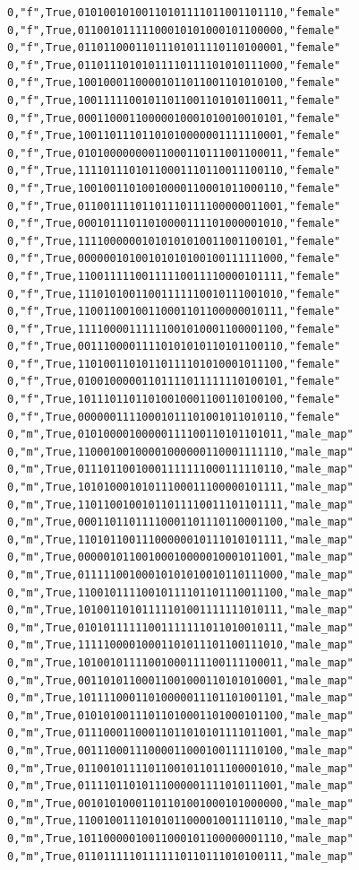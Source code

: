 \documentclass[authoryearcitations]{UoYCSproject}
\begin{document}
\begin{framed}
\begin{verbatim}
0,"f",True,01010010100110101111011001101110,"female"
0,"f",True,01100101111100010101000101100000,"female"
0,"f",True,01101100011011101011110110100001,"female"
0,"f",True,01101110101011110111101010111000,"female"
0,"f",True,10010001100001011011001101010100,"female"
0,"f",True,10011111001011011001101010110011,"female"
0,"f",True,00011000110000010001010010010101,"female"
0,"f",True,10011011101101010000001111110001,"female"
0,"f",True,01010000000011000110111001100011,"female"
0,"f",True,11110111010110001110110011100110,"female"
0,"f",True,10010011010010000110001011000110,"female"
0,"f",True,01100111101101110111100000011001,"female"
0,"f",True,00010111011010000111101000001010,"female"
0,"f",True,11110000001010101010011001100101,"female"
0,"f",True,00000010100101010100100111111000,"female"
0,"f",True,11001111100111110011110000101111,"female"
0,"f",True,11101010011001111110010111001010,"female"
0,"f",True,11001100100110001101100000010111,"female"
0,"f",True,11110000111111001010001100001100,"female"
0,"f",True,00111000011110101010110101100110,"female"
0,"f",True,11010011010110111101010001011100,"female"
0,"f",True,01001000001101111011111110100101,"female"
0,"f",True,10111011011010010001100110100100,"female"
0,"f",True,00000011110001011101001011010110,"female"
0,"m",True,01010000100000111100110101101011,"male_map"
0,"m",True,11000100100001000000110001111110,"male_map"
0,"m",True,01110110010001111111000111110110,"male_map"
0,"m",True,10101000101011100011100000101111,"male_map"
0,"m",True,11011001001011011110011101101111,"male_map"
0,"m",True,00011011011110001101110110001100,"male_map"
0,"m",True,11010110011100000010111010101111,"male_map"
0,"m",True,00000101100100010000010001011001,"male_map"
0,"m",True,01111100100010101010010110111000,"male_map"
0,"m",True,11001011110010111101101110011100,"male_map"
0,"m",True,10100110101111101001111111010111,"male_map"
0,"m",True,01010111111001111111011010010111,"male_map"
0,"m",True,11111000010001101011101100111010,"male_map"
0,"m",True,10100101111001000111100111100011,"male_map"
0,"m",True,00110101100011001000110101010001,"male_map"
0,"m",True,10111100011010000011101101001101,"male_map"
0,"m",True,01010100111011010001101000101100,"male_map"
0,"m",True,01110001100011011010101111011001,"male_map"
0,"m",True,00111000111000011000100111110100,"male_map"
0,"m",True,01100101111011001011011100001010,"male_map"
0,"m",True,01111011010111000001111010111001,"male_map"
0,"m",True,00101010001101101001000101000000,"male_map"
0,"m",True,11001001110101011000010011110110,"male_map"
0,"m",True,10110000010011000101100000001110,"male_map"
0,"m",True,01101111101111110110111010100111,"male_map"

\end{verbatim}
\end{framed}
\end{document}
